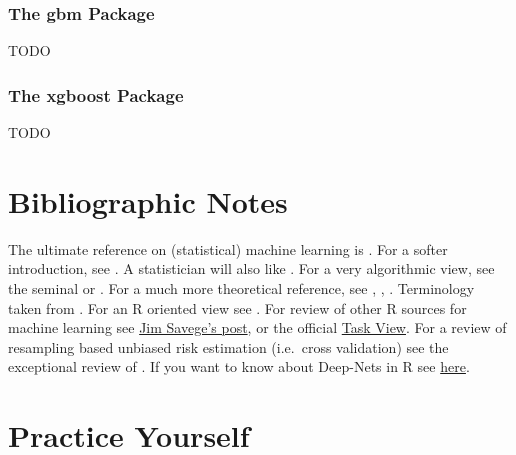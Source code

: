 \documentclass[]{book}
\theoremstyle{definition}
\theoremstyle{definition}
\theoremstyle{definition}
\theoremstyle{remark}
\begin{document}
\subsubsection{The gbm Package}\label{the-gbm-package}

TODO

\subsubsection{The xgboost Package}\label{the-xgboost-package}

TODO

\section{Bibliographic Notes}\label{bibliographic-notes-8}

The ultimate reference on (statistical) machine learning is
\citet{friedman2001elements}. For a softer introduction, see
\citet{james2013introduction}. A statistician will also like
\citet{ripley2007pattern}. For a very algorithmic view, see the seminal
\citet{leskovec2014mining} or \citet{conway2012machine}. For a much more
theoretical reference, see \citet{mohri2012foundations},
\citet{vapnik2013nature}, \citet{shalev2014understanding}. Terminology
taken from \citet{sammut2011encyclopedia}. For an R oriented view see
\citet{lantz2013machine}. For review of other R sources for machine
learning see
\href{http://modernstatisticalworkflow.blogspot.com/2018/01/some-good-introductory-machine-learning.html}{Jim
Savege's post}, or the official
\href{https://cran.r-project.org/web/views/MachineLearning.html}{Task
View}. For a review of resampling based unbiased risk estimation
(i.e.~cross validation) see the exceptional review of
\citet{arlot2010survey}. If you want to know about Deep-Nets in R see
\href{https://www.datacamp.com/community/tutorials/keras-r-deep-learning}{here}.

\section{Practice Yourself}\label{practice-yourself-6}
\end{document}
